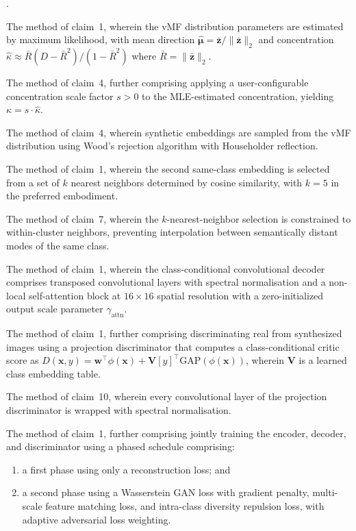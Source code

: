 \documentclass[12pt,letterpaper]{article}
\newcommand{\bz}{\mathbf{z}}
\newcommand{\bx}{\mathbf{x}}
\newcommand{\bw}{\mathbf{w}}
\newcommand{\bmu}{\bm{\mu}}
\newcounter{claimnum}
\newenvironment{claims}{%
  \setcounter{claimnum}{0}
  \begin{list}{\arabic{claimnum}.}{%
    \usecounter{claimnum}
    \setlength{\leftmargin}{2em}
    \setlength{\labelsep}{0.5em}
    \setlength{\itemsep}{0pt}
    \setlength{\parsep}{6pt plus 2pt}
  }%
}{\end{list}}
\begin{document}
\begin{claims}
\item The method of claim~1, wherein the vMF distribution parameters are
estimated by maximum likelihood, with mean direction
$\hat{\bmu} = \bar{\bz}/\|\bar{\bz}\|_2$ and concentration
$\hat{\kappa} \approx \bar{R}(D - \bar{R}^2)/(1 - \bar{R}^2)$ where
$\bar{R} = \|\bar{\bz}\|_2$.

\item The method of claim~4, further comprising applying a user-configurable
concentration scale factor $s > 0$ to the MLE-estimated concentration,
yielding $\kappa = s \cdot \hat{\kappa}$.

\item The method of claim~4, wherein synthetic embeddings are sampled from
the vMF distribution using Wood's rejection algorithm with Householder
reflection.

\item The method of claim~1, wherein the second same-class embedding is
selected from a set of $k$ nearest neighbors determined by cosine similarity,
with $k = 5$ in the preferred embodiment.

\item The method of claim~7, wherein the $k$-nearest-neighbor selection is
constrained to within-cluster neighbors, preventing interpolation between
semantically distant modes of the same class.

\item The method of claim~1, wherein the class-conditional convolutional
decoder comprises transposed convolutional layers with spectral
normalisation and a non-local self-attention block at $16 \times 16$
spatial resolution with a zero-initialized output scale parameter
$\gamma_{\text{attn}}$.

\item The method of claim~1, further comprising discriminating real from
synthesized images using a projection discriminator that computes a
class-conditional critic score as
$D(\bx, y) = \bw^\top\phi(\bx) + \mathbf{V}[y]^\top\text{GAP}(\phi(\bx))$,
wherein $\mathbf{V}$ is a learned class embedding table.

\item The method of claim~10, wherein every convolutional layer of the
projection discriminator is wrapped with spectral normalisation.

\item The method of claim~1, further comprising jointly training the encoder,
decoder, and discriminator using a phased schedule comprising:
\begin{enumerate}[label=(\roman*),nosep]
  \item a first phase using only a reconstruction loss; and
  \item a second phase using a Wasserstein GAN loss with gradient penalty,
    multi-scale feature matching loss, and intra-class diversity repulsion
    loss, with adaptive adversarial loss weighting.
\end{enumerate}


\end{claims}
\end{document}
